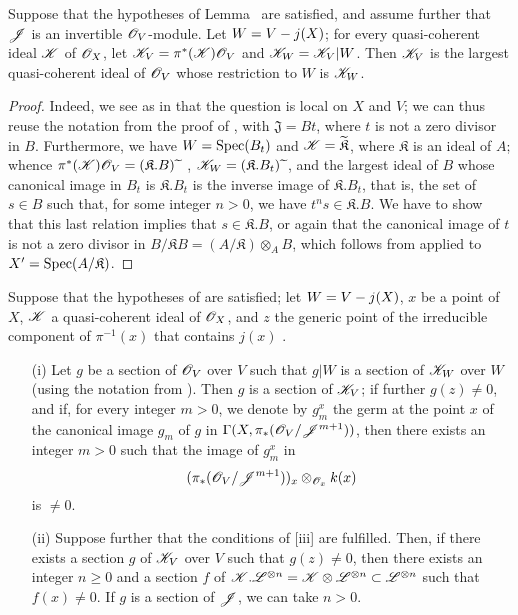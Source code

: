 \begin{corollary}[8.10.4]
\label{II.8.10.4}
Suppose that the hypotheses of Lemma~ are satisfied, and assume further that $\mathscr{J}$ is an invertible $\mathscr{O}_V$-module.
Let $W=V- j(X)$;
for every quasi-coherent ideal $\mathscr{K}$ of $\mathscr{O}_X$, let $\mathscr{K}_V=\pi^*(\mathscr{K})\mathscr{O}_V$ and $\mathscr{K}_W=\mathscr{K}_V|W$.
Then $\mathscr{K}_V$ is the largest quasi-coherent ideal of $\mathscr{O}_V$ whose restriction to $W$ is $\mathscr{K}_W$.
\end{corollary}

\begin{proof}
Indeed, we see as in  that the question is local on $X$ and $V$;
we can thus reuse the notation from the proof of , with $\mathfrak{J}=Bt$, where $t$ is not a zero divisor in $B$.
Furthermore, we have $W=\operatorname{Spec}(B_t)$ and $\mathscr{K}=\widetilde{\mathfrak{K}}$, where $\mathfrak{K}$ is an ideal of $A$;
whence $\pi^*(\mathscr{K})\mathscr{O}_V=(\mathfrak{K}.B){\,\widetilde{\,}\,}$ , $\mathscr{K}_W=(\mathfrak{K}.B_t){\,\widetilde{\,}\,}$, and the largest ideal
of $B$ whose canonical image in $B_t$ is $\mathfrak{K}.B_t$ is the inverse image of $\mathfrak{K}.B_t$, that is, the set of $s\in B$ such that, for some integer $n>0$, we have $t^ns\in\mathfrak{K}.B$.
We have to show that this last relation implies that $s\in\mathfrak{K}.B$, or again that the canonical image of $t$ is not a zero divisor in $B/\mathfrak{K}B=(A/\mathfrak{K})\otimes_AB$, which follows from  applied to $X'=\operatorname{Spec}(A/\mathfrak{K})$.
\end{proof}

\begin{corollary}[8.10.5]
\label{II.8.10.5}
Suppose that the hypotheses of  are satisfied;
let $W=V- j(X)$, $x$ be a point of $X$, $\mathscr{K}$ a quasi-coherent ideal of $\mathscr{O}_X$, and $z$ the generic point of the irreducible component of $\pi^{-1}(x)$ that contains $j(x)$ .
\begin{enumerate}
    \item[\rm{(i)}] Let $g$ be a section of $\mathscr{O}_V$ over $V$ such that $g|W$ is a section of $\mathscr{K}_W$ over $W$ (using the notation from ).
        Then $g$ is a section of $\mathscr{K}_V$;
        if further $g(z)\neq0$, and if, for every integer $m>0$, we denote by $g_m^x$ the germ at the point $x$ of the canonical image $g_m$ of $g$ in $\Gamma(X,\pi_*(\mathscr{O}_V/\mathscr{J}^{m+1}))$, then there exists an integer $m>0$ such that the image of $g_m^x$ in
        \[
            (\pi_*(\mathscr{O}_V/\mathscr{J}^{m+1}))_x \otimes_{\mathscr{O}_x} k(x)
        \]
        is $\neq0$.
    \item[\rm{(ii)}] Suppose further that the conditions of [iii] are fulfilled.
        Then, if there exists a section $g$ of $\mathscr{K}_V$ over $V$ such that $g(z)\neq0$, then there exists an integer $n\geq0$ and a section $f$ of $\mathscr{K}.\mathscr{L}^{\otimes n}=\mathscr{K}\otimes\mathscr{L}^{\otimes n}\subset\mathscr{L}^{\otimes n}$ such that $f(x)\neq0$.
        If $g$ is a section of $\mathscr{J}$, we can take $n>0$.
\end{enumerate}
\end{corollary}

